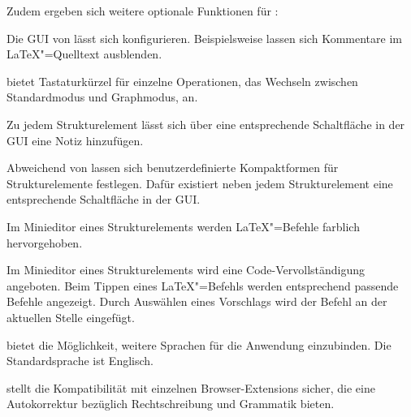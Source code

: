 Zudem ergeben sich weitere optionale Funktionen für \texla:


Die GUI von \texla{} lässt sich konfigurieren.
Beispielsweise lassen sich Kommentare im \LaTeX"=Quelltext ausblenden.


\texla{} bietet Tastaturkürzel für einzelne Operationen, \zB{} das Wechseln zwischen Standardmodus und Graphmodus, an.


Zu jedem Strukturelement lässt sich über eine entsprechende Schaltfläche in der GUI eine Notiz hinzufügen.


Abweichend von  lassen sich benutzerdefinierte Kompaktformen für Strukturelemente
festlegen.
Dafür existiert neben jedem Strukturelement eine entsprechende Schaltfläche in der GUI.


Im Minieditor eines Strukturelements werden \LaTeX"=Befehle farblich hervorgehoben.


Im Minieditor eines Strukturelements wird eine Code-Vervollständigung angeboten.
Beim Tippen eines \LaTeX"=Befehls werden entsprechend passende Befehle angezeigt.
Durch Auswählen eines Vorschlags wird der Befehl an der aktuellen Stelle eingefügt.

\clearpage


\texla{} bietet die Möglichkeit, weitere Sprachen für die Anwendung einzubinden.
Die Standardsprache ist Englisch.


\texla{} stellt die Kompatibilität mit einzelnen Browser-Extensions sicher, die eine Autokorrektur bezüglich
Rechtschreibung und Grammatik bieten.

